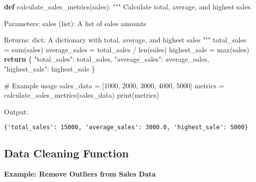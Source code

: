 \documentclass[
  letterpaper,
  DIV=11,
  numbers=noendperiod]{scrreprt}
\newenvironment{Shaded}{\begin{snugshade}}{\end{snugshade}}
\newcommand{\BuiltInTok}[1]{\textcolor[rgb]{0.00,0.23,0.31}{#1}}
\newcommand{\CommentTok}[1]{\textcolor[rgb]{0.37,0.37,0.37}{#1}}
\newcommand{\ControlFlowTok}[1]{\textcolor[rgb]{0.00,0.23,0.31}{\textbf{#1}}}
\newcommand{\DecValTok}[1]{\textcolor[rgb]{0.68,0.00,0.00}{#1}}
\newcommand{\KeywordTok}[1]{\textcolor[rgb]{0.00,0.23,0.31}{\textbf{#1}}}
\newcommand{\NormalTok}[1]{\textcolor[rgb]{0.00,0.23,0.31}{#1}}
\newcommand{\OperatorTok}[1]{\textcolor[rgb]{0.37,0.37,0.37}{#1}}
\newcommand{\StringTok}[1]{\textcolor[rgb]{0.13,0.47,0.30}{#1}}
\begin{document}
\begin{Shaded}
\begin{Highlighting}[]
\KeywordTok{def}\NormalTok{ calculate\_sales\_metrics(sales):}
    \CommentTok{"""}
\CommentTok{    Calculate total, average, and highest sales.}

\CommentTok{    Parameters:}
\CommentTok{    sales (list): A list of sales amounts}

\CommentTok{    Returns:}
\CommentTok{    dict: A dictionary with total, average, and highest sales}
\CommentTok{    """}
\NormalTok{    total\_sales }\OperatorTok{=} \BuiltInTok{sum}\NormalTok{(sales)}
\NormalTok{    average\_sales }\OperatorTok{=}\NormalTok{ total\_sales }\OperatorTok{/} \BuiltInTok{len}\NormalTok{(sales)}
\NormalTok{    highest\_sale }\OperatorTok{=} \BuiltInTok{max}\NormalTok{(sales)}
    \ControlFlowTok{return}\NormalTok{ \{}
        \StringTok{"total\_sales"}\NormalTok{: total\_sales,}
        \StringTok{"average\_sales"}\NormalTok{: average\_sales,}
        \StringTok{"highest\_sale"}\NormalTok{: highest\_sale}
\NormalTok{    \}}

\CommentTok{\# Example usage}
\NormalTok{sales\_data }\OperatorTok{=}\NormalTok{ [}\DecValTok{1000}\NormalTok{, }\DecValTok{2000}\NormalTok{, }\DecValTok{3000}\NormalTok{, }\DecValTok{4000}\NormalTok{, }\DecValTok{5000}\NormalTok{]}
\NormalTok{metrics }\OperatorTok{=}\NormalTok{ calculate\_sales\_metrics(sales\_data)}
\BuiltInTok{print}\NormalTok{(metrics)}
\end{Highlighting}
\end{Shaded}

Output:

\begin{verbatim}
{'total_sales': 15000, 'average_sales': 3000.0, 'highest_sale': 5000}
\end{verbatim}

\subsection{Data Cleaning Function}\label{data-cleaning-function}

\textbf{Example: Remove Outliers from Sales Data}
\end{document}

